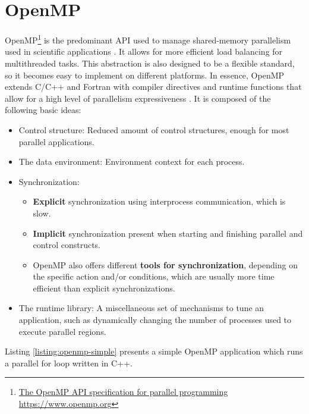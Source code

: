 \section{OpenMP}
OpenMP\footnote{\href{https://www.openmp.org}{{The OpenMP API specification for parallel programming} \url{https://www.openmp.org}}} is the predominant API used to manage shared-memory parallelism used in scientific applications \cite{Luecke:2015:Fast}.
It allows for more efficient load balancing for multithreaded tasks.
This abstraction is also designed to be a flexible standard, so it becomes easy to implement on different platforms.
In essence, OpenMP extends C/C++ and Fortran with compiler directives and runtime functions that allow for a high level of parallelism expressiveness \cite{Dagum:1998:OpenMP}.
It is composed of the following basic ideas:
\begin{itemize}
    \item Control structure: Reduced amount of control structures, enough for most parallel applications.
    \item The data environment: Environment context for each process.
    \item Synchronization:
    \begin{itemize}
        \item \textbf{Explicit} synchronization using interprocess communication, which is slow.
        \item \textbf{Implicit} synchronization present when starting and finishing parallel and control constructs.
        \item OpenMP also offers different \textbf{tools for synchronization}, depending on the specific action and/or conditions, which are usually more time efficient than explicit synchronizations.
    \end{itemize}
    \item The runtime library: A miscellaneous set of mechanisms to tune an application, such as dynamically changing the number of processes used to execute parallel regions.
\end{itemize}

Listing \ref{listing:openmp-simple} presents a simple OpenMP application which runs a parallel for loop written in C++.



